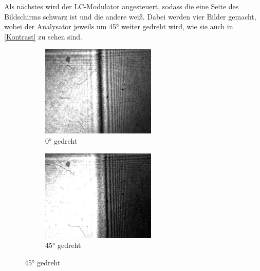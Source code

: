 Als nächstes wird der LC-Modulator angesteuert, sodass die eine Seite des Bildschirms schwarz ist und die andere weiß. Dabei werden vier Bilder gemacht, wobei der Analysator jeweils um 45° weiter gedreht wird, wie sie auch in \cref{Kontrast} zu sehen sind. 

\begin{figure}
	\begin{subfigure}[]{0.5\textwidth}
		\includegraphics[width=0.6\textwidth]{4.1.2_0Grad.png}
		\caption{0° gedreht}
	\end{subfigure}
	\begin{subfigure}[]{0.5\textwidth}
		\includegraphics[width=0.6\textwidth]{4.1.2_45Grad.png}
		\caption{45° gedreht}
		\label{45}
	\end{subfigure}



\end{figure}

